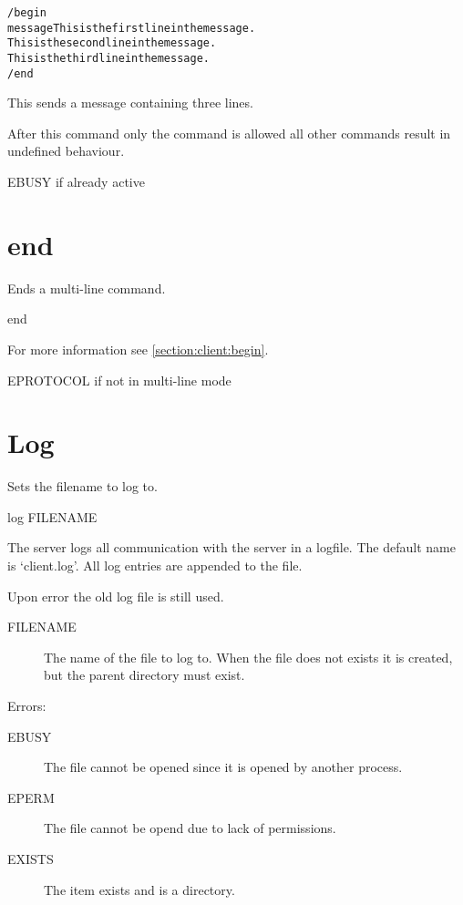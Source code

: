 \begin{alltt}
/begin
message This is the first line in the message.
This is the second line in the message.
This is the third line in the message.
/end
\end{alltt}

This sends a message containing three lines.

After this command only the  command is allowed
all other commands result in undefined behaviour.



EBUSY if already active


\section{end}
\label{section:client:end}

Ends a multi-line command.

\indent end

For more information see \cref{section:client:begin}.

EPROTOCOL if not in multi-line mode


\section{Log}
\label{section:client:log}

Sets the filename to log to.

\indent log FILENAME

The server logs all communication with the server in a logfile. The default
name is `client.log'. All log entries are appended to the file.

Upon error the old log file is still used.

\begin{description}
\item[FILENAME]
	The name of the file to log to. When the file does not exists it is
	created, but the parent directory must exist.
\end{description}

Errors:
\begin{description}
\item[EBUSY]
	The file cannot be opened since it is opened by another process.

\item[EPERM]
	The file cannot be opend due to lack of permissions.

\item[EXISTS]
	The item exists and is a directory.

\end{description}


